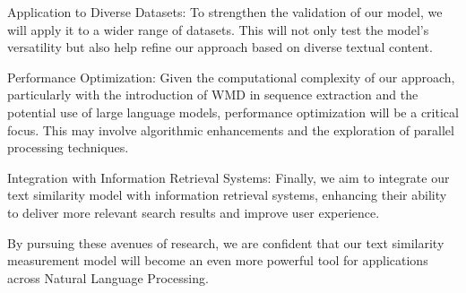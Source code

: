 \documentclass[UTF8]{ctexart}
\begin{document}
{    Application to Diverse Datasets: To strengthen the validation of our model, we will apply it to a wider range of datasets. 
    This will not only test the model's versatility but also help refine our approach based on diverse textual content.

    Performance Optimization: Given the computational complexity of our approach, 
    particularly with the introduction of WMD in sequence extraction and the potential use of large language models, 
    performance optimization will be a critical focus. 
    This may involve algorithmic enhancements and the exploration of parallel processing techniques.

    Integration with Information Retrieval Systems: Finally, we aim to integrate our text similarity model with information retrieval systems, 
    enhancing their ability to deliver more relevant search results and improve user experience.

    By pursuing these avenues of research, 
    we are confident that our text similarity measurement model will become an 
    even more powerful tool for applications across Natural Language Processing.
}
\newpage
\end{document}

